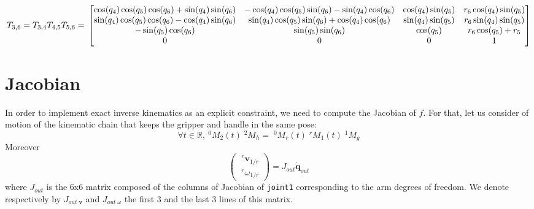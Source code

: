 \documentclass{article}
\newcommand\linvel{\mathbf{v}}
\newcommand\conf{\mathbf{q}}
\newcommand\reals{\mathbb{R}}
\begin{document}
\[
T_{3,6} = T_{3,4} T_{4,5} T_{5,6}= \\
\begin{bmatrix}
  \cos(q_4)\cos(q_5)\cos(q_6)+\sin(q_4)\sin(q_6) & -\cos(q_4)\cos(q_5)\sin(q_6)-\sin(q_4)\cos(q_6) & \cos(q_4)\sin(q_5) & r_6\cos(q_4)\sin(q_5) \\
  \sin(q_4)\cos(q_5)\cos(q_6)-\cos(q_4)\sin(q_6) & \sin(q_4)\cos(q_5)\sin(q_6)+\cos(q_4)\cos(q_6) & \sin(q_4)\sin(q_5) & r_6\sin(q_4)\sin(q_5) \\
  -\sin(q_5)\cos(q_6) & \sin(q_5)\sin(q_6) & \cos(q_5) & r_6\cos(q_5) + r_5   \\
  0 & 0 & 0 & 1 \\
\end{bmatrix}
\]







\section{Jacobian}

In order to implement exact inverse kinematics as an explicit constraint, we need to compute the Jacobian of $f$. For that, let us consider of motion of the kinematic chain that keeps the gripper and handle in the same pose:
\begin{equation}\label{eq:jac1}
\forall t\in\reals,\ ^0M_2(t)\;^2M_h = \;^0M_r(t) \;^rM_1(t)\;^1M_g
\end{equation}
Moreover
\begin{equation}\label{eq:jacobian arm}
\left(\begin{array}{c}
  \;^r\linvel_{1/r} \\ \;^r\omega_{1/r}
\end{array}\right) =
J_{out} \dot{\conf}_{out}
\end{equation}
where $J_{out}$ is the 6x6 matrix composed of the columns of Jacobian of \texttt{joint1} corresponding to the arm degrees of freedom. We denote respectively by $J_{out\;\linvel}$ and $J_{out\;\omega}$ the first 3 and the last 3 lines of this matrix.
\end{document}
